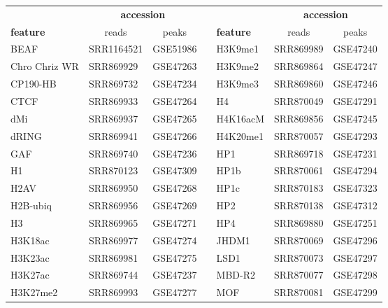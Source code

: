 \begin{table}[htbp]
\centering
\begin{tabular}{lllllll}
\cline{1-3} \cline{5-7}
                 & \multicolumn{2}{c}{\textbf{accession}} &  & & \multicolumn{2}{c}{\textbf{accession}}  \\
\textbf{feature} & \multicolumn{1}{c}{reads}           & \multicolumn{1}{c}{peaks}            &  & \textbf{feature} & \multicolumn{1}{c}{reads} & \multicolumn{1}{c}{peaks}    \\ \cline{1-3} \cline{5-7} 
BEAF             & SRR1164521          & GSE51986         &  & H3K9me1          & SRR869989 & GSE47240 \\
Chro Chriz WR    & SRR869929           & GSE47263         &  & H3K9me2          & SRR869864 & GSE47247 \\
CP190-HB         & SRR869732           & GSE47234         &  & H3K9me3          & SRR869860 & GSE47246 \\
CTCF             & SRR869933           & GSE47264         &  & H4               & SRR870049 & GSE47291 \\
dMi              & SRR869937           & GSE47265         &  & H4K16acM         & SRR869856 & GSE47245 \\
dRING            & SRR869941           & GSE47266         &  & H4K20me1         & SRR870057 & GSE47293 \\
GAF              & SRR869740           & GSE47236         &  & HP1              & SRR869718 & GSE47231 \\
H1               & SRR870123           & GSE47309         &  & HP1b             & SRR870061 & GSE47294 \\
H2AV             & SRR869950           & GSE47268         &  & HP1c             & SRR870183 & GSE47323 \\
H2B-ubiq         & SRR869956           & GSE47269         &  & HP2              & SRR870138 & GSE47312 \\
H3               & SRR869965           & GSE47271         &  & HP4              & SRR869880 & GSE47251 \\
H3K18ac          & SRR869977           & GSE47274         &  & JHDM1            & SRR870069 & GSE47296 \\
H3K23ac          & SRR869981           & GSE47275         &  & LSD1             & SRR870073 & GSE47297 \\
H3K27ac          & SRR869744           & GSE47237         &  & MBD-R2           & SRR870077 & GSE47298 \\
H3K27me2         & SRR869993           & GSE47277         &  & MOF              & SRR870081 & GSE47299 \\

\end{tabular}
\end{table}
